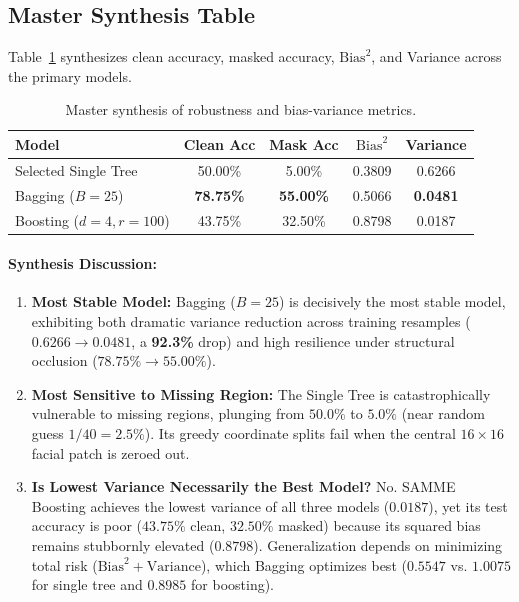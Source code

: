 \documentclass[10pt,twocolumn,letterpaper]{article}
\begin{document}
\subsection{Master Synthesis Table}
Table~\ref{tab:q3_master} synthesizes clean accuracy, masked accuracy, $\text{Bias}^2$, and Variance across the primary models.

\begin{table}[h]
\centering
\small
\caption{Master synthesis of robustness and bias-variance metrics.}
\label{tab:q3_master}
\begin{tabular}{lcccc}
\toprule
Model & Clean Acc & Mask Acc & $\text{Bias}^2$ & Variance \\
\midrule
Selected Single Tree & 50.00\% & 5.00\% & 0.3809 & 0.6266 \\
Bagging ($B=25$) & \textbf{78.75\%} & \textbf{55.00\%} & 0.5066 & \textbf{0.0481} \\
Boosting ($d=4, r=100$) & 43.75\% & 32.50\% & 0.8798 & 0.0187 \\
\bottomrule
\end{tabular}
\end{table}

\paragraph{Synthesis Discussion:}
\begin{enumerate}[leftmargin=*]
    \item \textbf{Most Stable Model:} Bagging ($B=25$) is decisively the most stable model, exhibiting both dramatic variance reduction across training resamples ($0.6266 \to 0.0481$, a \textbf{92.3\%} drop) and high resilience under structural occlusion ($78.75\% \to 55.00\%$).
    \item \textbf{Most Sensitive to Missing Region:} The Single Tree is catastrophically vulnerable to missing regions, plunging from $50.0\%$ to $5.0\%$ (near random guess $1/40 = 2.5\%$). Its greedy coordinate splits fail when the central $16 \times 16$ facial patch is zeroed out.
    \item \textbf{Is Lowest Variance Necessarily the Best Model?} No. SAMME Boosting achieves the lowest variance of all three models ($0.0187$), yet its test accuracy is poor ($43.75\%$ clean, $32.50\%$ masked) because its squared bias remains stubbornly elevated ($0.8798$). Generalization depends on minimizing total risk ($\text{Bias}^2 + \text{Variance}$), which Bagging optimizes best ($0.5547$ vs. $1.0075$ for single tree and $0.8985$ for boosting).
\end{enumerate}
\end{document}
